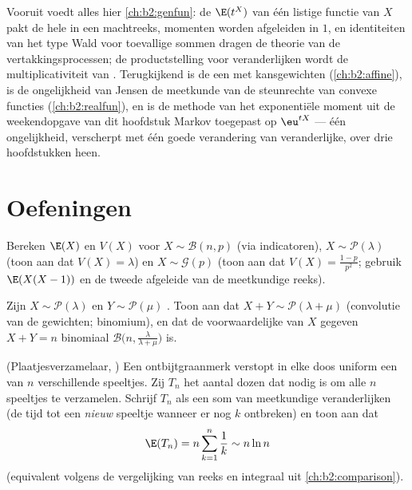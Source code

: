\begin{remark}
Vooruit voedt alles hier \cref{ch:b2:genfun}: de
 $\E(t^X)$ van één listige functie van $X$ pakt
de hele  in een machtreeks, momenten worden afgeleiden in
$1$, en identiteiten van het type Wald voor toevallige sommen
dragen de theorie van de vertakkingsprocessen; de productstelling
voor  veranderlijken wordt de multiplicativiteit van
. Terugkijkend is de  een
 met kansgewichten (\cref{ch:b2:affine}), is de
ongelijkheid van Jensen de meetkunde van de steunrechte van convexe
functies (\cref{ch:b2:realfun}), en is de methode van het
exponentiële moment uit de weekendopgave van dit hoofdstuk Markov
toegepast op $\eu^{tX}$ --- één ongelijkheid, verscherpt met één
goede verandering van veranderlijke, over drie hoofdstukken heen.
\end{remark}

\section{Oefeningen}

\begin{exercise}[$\star$]\label{exo:b2:randomvar:1}
Bereken $\E(X)$ en $V(X)$ voor $X \sim \mathcal{B}(n, p)$ (via
indicatoren), $X \sim \mathcal{P}(\lambda)$ (toon aan dat $V(X) =
\lambda$) en $X \sim \mathcal{G}(p)$ (toon aan dat $V(X) =
\frac{1-p}{p^2}$; gebruik $\E(X(X-1))$ en de tweede afgeleide van
de meetkundige reeks).
\end{exercise}

\begin{exercise}[$\star$]\label{exo:b2:randomvar:2}
Zijn $X \sim \mathcal{P}(\lambda)$ en $Y \sim \mathcal{P}(\mu)$
. Toon aan dat $X + Y \sim \mathcal{P}(\lambda + \mu)$
(convolutie van de gewichten; binomium), en dat de voorwaardelijke
 van $X$ gegeven $X + Y = n$ binomiaal
$\mathcal{B}\bigl(n, \frac{\lambda}{\lambda + \mu}\bigr)$ is.
\end{exercise}

\begin{exercise}[$\star$]\label{exo:b2:randomvar:3}
(Plaatjesverzamelaar, ) Een ontbijtgraanmerk
verstopt in elke doos uniform een van $n$ verschillende speeltjes.
Zij $T_n$ het aantal dozen dat nodig is om alle $n$ speeltjes te
verzamelen. Schrijf $T_n$ als een som van 
meetkundige veranderlijken (de tijd tot een \emph{nieuw} speeltje
wanneer er nog $k$ ontbreken) en toon aan dat
\[
\E(T_n) = n\sum_{k=1}^{n}\frac{1}{k} \sim n\ln n
\]
(equivalent volgens de vergelijking van reeks en integraal uit
\cref{ch:b2:comparison}).
\end{exercise}

